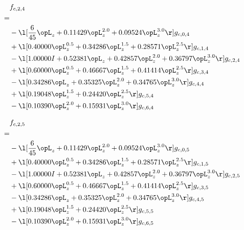\begin{alignat}{2} 
\label{eq:f_24_0} 
& f_{c,2,4} \nonumber \\ 
 = \\ 
& - \l[ \frac{6}{45} \opL_z +  0.11429 \opL_z^{2.0} +  0.09524 \opL_z^{3.0}  \r] g_{c,0,4} \nonumber \\ 
& + \l[  0.40000 \opL_z^{0.5} +  0.34286 \opL_z^{1.5} +  0.28571 \opL_z^{2.5}  \r] g_{c,1,4} \nonumber \\ 
& - \l[  1.00000 I +  0.52381 \opL_z +  0.42857 \opL_z^{2.0} +  0.36797 \opL_z^{3.0}  \r] g_{c,2,4} \nonumber \\ 
& + \l[  0.60000 \opL_z^{0.5} +  0.46667 \opL_z^{1.5} +  0.41414 \opL_z^{2.5}  \r] g_{c,3,4} \nonumber \\ 
& - \l[  0.34286 \opL_z +  0.35325 \opL_z^{2.0} +  0.34765 \opL_z^{3.0}  \r] g_{c,4,4} \nonumber \\ 
& + \l[  0.19048 \opL_z^{1.5} +  0.24420 \opL_z^{2.5}  \r] g_{c,5,4} \nonumber \\ 
& - \l[  0.10390 \opL_z^{2.0} +  0.15931 \opL_z^{3.0}  \r] g_{c,6,4} \nonumber \\ 
\end{alignat} 


\begin{alignat}{2} 
\label{eq:f_25_0} 
& f_{c,2,5} \nonumber \\ 
 = \\ 
& - \l[ \frac{6}{45} \opL_z +  0.11429 \opL_z^{2.0} +  0.09524 \opL_z^{3.0}  \r] g_{c,0,5} \nonumber \\ 
& + \l[  0.40000 \opL_z^{0.5} +  0.34286 \opL_z^{1.5} +  0.28571 \opL_z^{2.5}  \r] g_{c,1,5} \nonumber \\ 
& - \l[  1.00000 I +  0.52381 \opL_z +  0.42857 \opL_z^{2.0} +  0.36797 \opL_z^{3.0}  \r] g_{c,2,5} \nonumber \\ 
& + \l[  0.60000 \opL_z^{0.5} +  0.46667 \opL_z^{1.5} +  0.41414 \opL_z^{2.5}  \r] g_{c,3,5} \nonumber \\ 
& - \l[  0.34286 \opL_z +  0.35325 \opL_z^{2.0} +  0.34765 \opL_z^{3.0}  \r] g_{c,4,5} \nonumber \\ 
& + \l[  0.19048 \opL_z^{1.5} +  0.24420 \opL_z^{2.5}  \r] g_{c,5,5} \nonumber \\ 
& - \l[  0.10390 \opL_z^{2.0} +  0.15931 \opL_z^{3.0}  \r] g_{c,6,5} \nonumber \\ 
\end{alignat} 


